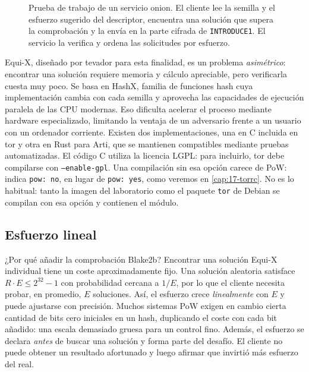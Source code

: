 \begin{figure}[htbp]
\centering

\caption{Prueba de trabajo de un servicio onion. El cliente lee la semilla y el esfuerzo sugerido del descriptor, encuentra una solución que supera la comprobación y la envía en la parte cifrada de \texttt{INTRODUCE1}. El servicio la verifica y ordena las solicitudes por esfuerzo.}
\label{fig:pow}
\end{figure}

\begin{approfondimento}
Equi-X, diseñado por tevador para esta finalidad, es un problema \emph{asimétrico}: encontrar una solución requiere memoria y cálculo apreciable, pero verificarla cuesta muy poco. Se basa en HashX, familia de funciones hash cuya implementación cambia con cada semilla y aprovecha las capacidades de ejecución paralela de las CPU modernas. Eso dificulta acelerar el proceso mediante hardware especializado, limitando la ventaja de un adversario frente a un usuario con un ordenador corriente. Existen dos implementaciones, una en C incluida en tor y otra en Rust para Arti, que se mantienen compatibles mediante pruebas automatizadas. El código C utiliza la licencia LGPL: para incluirlo, tor debe compilarse con \texttt{--enable-gpl}. Una compilación sin esa opción carece de PoW:  indica \texttt{pow: no}, en lugar de \texttt{pow: yes}, como veremos en \cref{cap:17-torrc}. No es lo habitual: tanto la imagen del laboratorio como el paquete \texttt{tor} de Debian se compilan con esa opción y contienen el módulo.
\end{approfondimento}

\subsection{Esfuerzo lineal}

¿Por qué añadir la comprobación Blake2b? Encontrar una solución Equi-X individual tiene un coste aproximadamente fijo. Una solución aleatoria satisface $R\cdot E\le2^{32}-1$ con probabilidad cercana a $1/E$, por lo que el cliente necesita probar, en promedio, $E$ soluciones. Así, el esfuerzo crece \emph{linealmente} con $E$ y puede ajustarse con precisión. Muchos sistemas PoW exigen en cambio cierta cantidad de bits cero iniciales en un hash, duplicando el coste con cada bit añadido: una escala demasiado gruesa para un control fino. Además, el esfuerzo se declara \emph{antes} de buscar una solución y forma parte del desafío. El cliente no puede obtener un resultado afortunado y luego afirmar que invirtió más esfuerzo del real.

